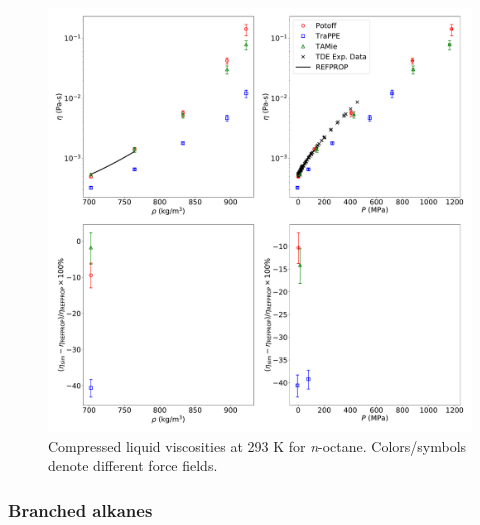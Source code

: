 \documentclass[preprint,review,12pt]{elsarticle}
\begin{document}
	\begin{figure}[htb!]
		\centering
		\includegraphics[width=6.4in]{compare_REFPROP_T293highP_C8H18_all.pdf}
		\caption{Compressed liquid viscosities at 293 K for \textit{n}-octane. Colors/symbols denote different force fields.}
		\label{fig:T293highP_C8}
	\end{figure} 
	
	\subsubsection{Branched alkanes}
	
	
	
\end{document}
